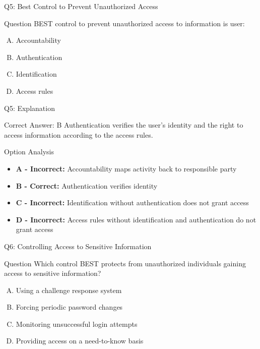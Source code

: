 \documentclass{beamer}
\begin{document}
	\begin{frame}{Q5: Best Control to Prevent Unauthorized Access}
		\begin{block}{Question}
			BEST control to prevent unauthorized access to information is user:
		\end{block}
		\begin{enumerate}[(A)]
			\item Accountability
			\item Authentication
			\item Identification
			\item Access rules
		\end{enumerate}
	\end{frame}
	
	\begin{frame}{Q5: Explanation}
		\begin{block}{Correct Answer: B}
			Authentication verifies the user's identity and the right to access information according to the access rules.
		\end{block}
		\begin{block}{Option Analysis}
			\begin{itemize}
				\item \textbf{A - Incorrect:} Accountability maps activity back to responsible party
				\item \textbf{B - Correct:} Authentication verifies identity
				\item \textbf{C - Incorrect:} Identification without authentication does not grant access
				\item \textbf{D - Incorrect:} Access rules without identification and authentication do not grant access
			\end{itemize}
		\end{block}
	\end{frame}
	
	\begin{frame}{Q6: Controlling Access to Sensitive Information}
		\begin{block}{Question}
			Which control BEST protects from unauthorized individuals gaining access to sensitive information?
		\end{block}
		\begin{enumerate}[(A)]
			\item Using a challenge response system
			\item Forcing periodic password changes
			\item Monitoring unsuccessful login attempts
			\item Providing access on a need-to-know basis
		\end{enumerate}
	\end{frame}
	
\end{document}
